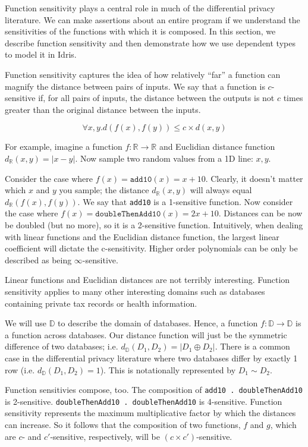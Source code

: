 \documentclass[12pt]{article}
\begin{document}
Function sensitivity plays a central role in much of the differential privacy literature.
We can make assertions about an entire program if we understand the sensitivities of the functions with which it is composed.
In this section, we describe function sensitivity and then demonstrate how we use dependent types to model it in Idris.

Function sensitivity captures the idea of how relatively ``far'' a function can magnify the distance between pairs of inputs.
We say that a function is $c$-sensitive if, for all pairs of inputs, the distance between the outputs is not $c$ times greater than the original distance between the inputs.

	$$ \forall x,y. d(f(x),f(y)) \le c \times d(x,y) $$

For example, imagine a function $f : \mathbb R \rightarrow \mathbb R$ and Euclidian distance function $d_{\mathbb R}(x,y) = |x-y|$.
Now sample two random values from a 1D line: $x,y$.

Consider the case where $f(x) = \texttt{add10}(x) = x + 10$.
Clearly, it doesn't matter which $x$ and $y$ you sample; the distance $d_{\mathbb R}(x,y)$ will always equal $d_{\mathbb R}(f(x),f(y))$.
We say that \texttt{add10} is a 1-sensitive function.
Now consider the case where $f(x) = \texttt{doubleThenAdd10}(x) = 2x + 10$.
Distances can be now be doubled (but no more), so it is a 2-sensitive function.
Intuitively, when dealing with linear functions and the Euclidian distance function, the largest linear coefficient will dictate the c-sensitivity.
Higher order polynomials can be only be described as being $\infty$-sensitive.

Linear functions and Euclidian distances are not terribly interesting.
Function sensitivity applies to many other interesting domains such as databases containing private tax records or health information.

We will use $\mathbb D$ to describe the domain of databases.
Hence, a function $f : \mathbb D \rightarrow \mathbb D$ is a function across databases.
Our distance function will just be the symmetric difference of two databases; i.e. $d_{\mathbb D}(D_1,D_2) = | D_1 \oplus D_2 |$.
There is a common case in the differential privacy literature where two databases differ by exactly 1 row (i.e. $d_{\mathbb D}(D_1,D_2)=1$).
This is notationally represented by $D_1 \sim D_2$.

Function sensitivies compose, too.
The composition of \texttt{add10 . doubleThenAdd10} is 2-sensitive.
\texttt{doubleThenAdd10 . doubleThenAdd10} is 4-sensitive.
Function sensitivity represents the maximum multiplicative factor by which the distances can increase.
So it follows that the composition of two functions, $f$ and $g$, which are $c$- and $c'$-sensitive, respectively, will be $(c \times c')$-sensitive.
\end{document}
